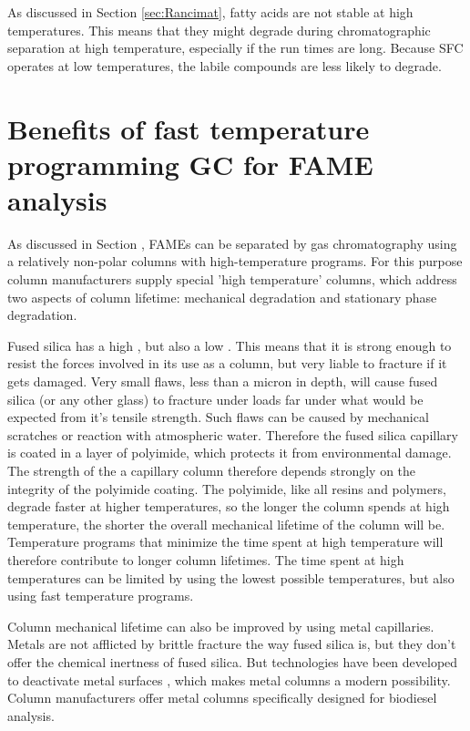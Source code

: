 As discussed in Section \ref{sec:Rancimat}, fatty acids are not stable at high
temperatures. This means that they might degrade during chromatographic
separation at high temperature, especially if the run times are long. Because
SFC operates at low temperatures, the labile compounds are less likely to degrade. 

\section[Benefits of fast GC]{Benefits of fast temperature programming GC for FAME analysis}

As discussed in Section \label{sec:ChromDet}, FAMEs can be separated by gas
chromatography using a relatively non-polar columns with high-temperature
programs. For this purpose column manufacturers supply special 'high
temperature' columns, which address two aspects of column lifetime: mechanical
degradation and stationary phase degradation. 

Fused silica has a high , but also a low
. This means that it is strong enough to resist the
forces involved in its use as a column, but very liable to fracture if it gets
damaged. Very small flaws, less than a micron in depth, will cause fused silica
(or any other glass) to fracture under loads far under what would be expected
from it's tensile strength. Such flaws can be caused by mechanical scratches or
reaction with atmospheric water. Therefore the fused silica capillary is coated
in a layer of polyimide, which protects it from environmental damage. The
strength of the a capillary column therefore depends strongly on the integrity
of the polyimide coating. The polyimide, like all resins and polymers, degrade
faster at higher temperatures, so the longer the column spends at high
temperature, the shorter the overall mechanical lifetime of the column will be.
Temperature programs that minimize the time spent at high temperature will
therefore contribute to longer column lifetimes. The time spent at high
temperatures can be limited by using the lowest possible temperatures, but also
using fast temperature programs. 

Column mechanical lifetime can also be improved by using metal capillaries.
Metals are not afflicted by brittle fracture the way fused silica is, but they
don't offer the chemical inertness of fused silica. But technologies have been
developed to deactivate metal surfaces \autocite{Smith2002}, which makes metal
columns a modern possibility. Column manufacturers offer metal columns
specifically designed for biodiesel analysis.

